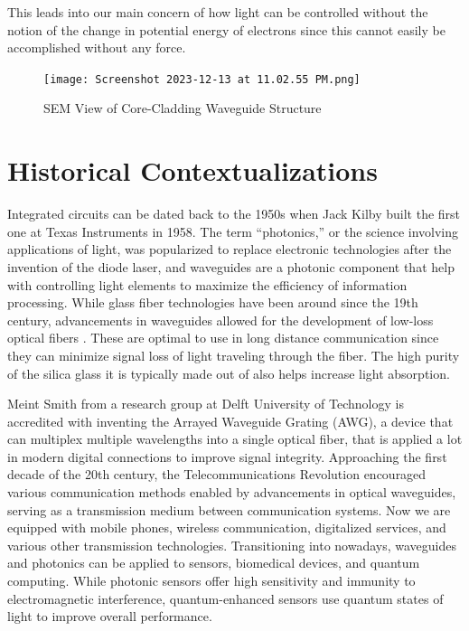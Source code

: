 \documentclass[10pt]{article}
\begin{document}
This leads into our main concern of how light can be controlled without the notion of the change in potential 
energy of electrons since this cannot easily be accomplished without any force.

\begin{figure}[h]
    \centering
    \texttt{[image: Screenshot 2023-12-13 at 11.02.55 PM.png]}
    \caption{SEM View of Core-Cladding Waveguide Structure} 
    \end{figure}


\section{Historical Contextualizations}

Integrated circuits can be dated back to the 1950s when Jack Kilby built the first one at Texas Instruments in 1958. 
The term “photonics,” or the science involving applications of light, was popularized to replace electronic technologies 
after the invention of the diode laser, and waveguides are a photonic component that help with controlling light 
elements to maximize the efficiency of information processing. While glass fiber technologies have been around 
since the 19th century, advancements in waveguides allowed for the development of low-loss optical fibers \cite{ref03}.
These are optimal to use in long distance communication since they can minimize signal loss of light traveling 
through the fiber. The high purity of the silica glass it is typically made out of also helps increase light absorption. 

Meint Smith from a research group at Delft University of Technology is accredited with inventing the Arrayed Waveguide Grating (AWG), a device that can multiplex multiple wavelengths into a single optical fiber, that is applied a lot in modern digital connections to improve signal integrity. 
Approaching the first decade of the 20th century, the Telecommunications Revolution encouraged various communication methods enabled by advancements in optical waveguides, serving as a transmission medium between communication systems. 
Now we are equipped with mobile phones, wireless communication, digitalized services, and various other transmission technologies. 
Transitioning into nowadays, waveguides and photonics can be applied to sensors, biomedical devices, and quantum computing. 
While photonic sensors offer high sensitivity and immunity to electromagnetic interference, quantum-enhanced sensors use quantum states of light to improve overall performance.
\end{document}
